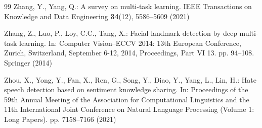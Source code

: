 \documentclass[runningheads]{llncs}
\begin{document}
\begin{thebibliography}{99}
Zhang, Y., Yang, Q.: A survey on multi-task learning. IEEE Transactions on
  Knowledge and Data Engineering  \textbf{34}(12),  5586--5609 (2021)

Zhang, Z., Luo, P., Loy, C.C., Tang, X.: Facial landmark detection by deep
  multi-task learning. In: Computer Vision--ECCV 2014: 13th European
  Conference, Zurich, Switzerland, September 6-12, 2014, Proceedings, Part VI
  13. pp. 94--108. Springer (2014)

Zhou, X., Yong, Y., Fan, X., Ren, G., Song, Y., Diao, Y., Yang, L., Lin, H.:
  Hate speech detection based on sentiment knowledge sharing. In: Proceedings
  of the 59th Annual Meeting of the Association for Computational Linguistics
  and the 11th International Joint Conference on Natural Language Processing
  (Volume 1: Long Papers). pp. 7158--7166 (2021)
\end{thebibliography}
\end{document}
